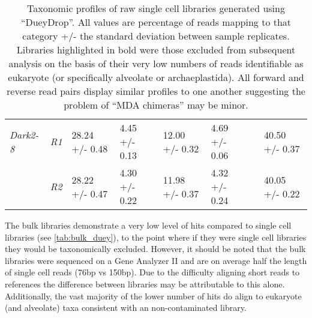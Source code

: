 \begin{table}[h]
\begin{tabularx}{\textwidth}{|l||l|l|l|l|l|l|l|}
         \textit{Dark2-8}     & \textit{R1}                   & 28.24 +/- 0.48     & 4.45 +/- 0.13     & 12.00 +/- 0.32     & 4.69 +/- 0.06          &  & 40.50 +/- 0.37      \\ \cmidrule(lr){2-2}
                              & \textit{R2}                   & 28.22 +/- 0.47     & 4.30 +/- 0.22     & 11.98 +/- 0.37     & 4.32 +/- 0.24          &  & 40.05 +/- 0.22      \\ \cmidrule(r){1-6} \cmidrule(l){8-8} 
         \hline
     \end{tabularx}
     \caption{Taxonomic profiles of raw single cell libraries generated using ``DueyDrop''. All values are percentage of reads mapping to that category +/- the standard deviation between sample replicates.  Libraries
     highlighted in bold were those excluded from subsequent analysis on the basis of their very low numbers of reads identifiable as 
 eukaryote (or specifically alveolate or archaeplastida). All forward and reverse read pairs display similar profiles to one another suggesting
 the problem of ``MDA chimeras'' may be minor.}
 \label{tab:sct_duey}
\end{table}

The bulk libraries demonstrate a very low level of hits compared to single cell libraries (see \cref{tab:bulk_duey}), 
to the point where if they were single cell libraries they would be taxonomically excluded. 
However, it should be noted that the bulk libraries were sequenced on a Gene Analyzer II and are on average
half the length of single cell reads (76bp vs 150bp). Due to the difficulty aligning short reads
to references the difference between libraries may be attributable to this alone. 
Additionally, the vast majority of the lower number of hits do align to eukaryote (and alveolate) 
taxa consistent with an non-contaminated library. 

